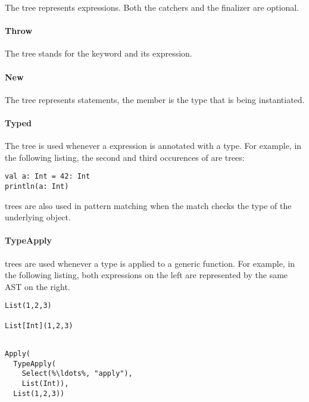 \noindent The  tree represents  expressions. Both the catchers and the finalizer are optional.

\paragraph{Throw} 

\noindent The  tree stands for the  keyword and its expression.

\paragraph{New} 

\noindent The  tree represents  statements, the  member is the type that is being instantiated.

\paragraph{Typed} 

\noindent The  tree is used whenever a expression is annotated with a type. For example, in the following listing, the second and third occurences of  are  trees:

\begin{lstlisting}
val a: Int = 42: Int
println(a: Int)
\end{lstlisting}

 trees are also used in pattern matching when the match checks the type of the underlying object.

\paragraph{TypeApply} 

\noindent {} trees are used whenever a type is applied to a generic function. For example, in the following listing, both expressions on the left are represented by the same AST on the right.

\begin{multicols}{2}
\begin{lstlisting}
List(1,2,3)

List[Int](1,2,3)


\end{lstlisting}
\begin{lstlisting}
Apply(
  TypeApply(
    Select(%\ldots%, "apply"), 
    List(Int)), 
  List(1,2,3))
\end{lstlisting}
\end{multicols}

